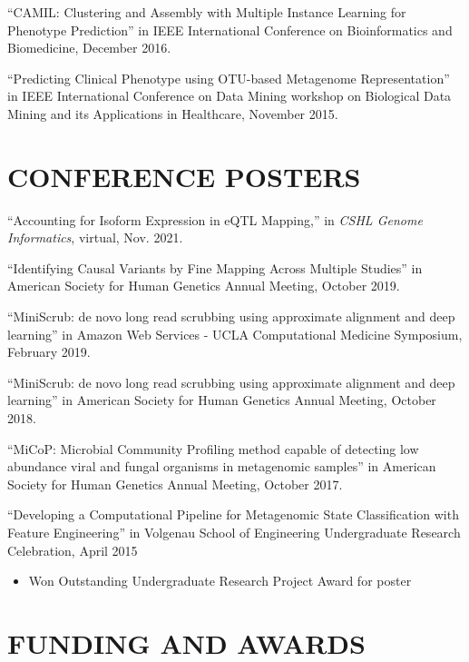 \documentclass[margin, 10pt]{res} %
\begin{document}
\begin{resume}
``CAMIL: Clustering and Assembly with Multiple Instance Learning for Phenotype Prediction'' in IEEE International Conference on Bioinformatics and Biomedicine, December 2016.

``Predicting Clinical Phenotype using OTU-based Metagenome Representation'' in IEEE International Conference on Data Mining workshop on Biological Data Mining and its Applications in Healthcare, November 2015.


\section{CONFERENCE POSTERS}

``Accounting for Isoform Expression in eQTL Mapping,'' in {\sl CSHL Genome Informatics}, virtual, Nov. 2021.

``Identifying Causal Variants by Fine Mapping Across Multiple Studies'' in American Society for Human Genetics Annual Meeting, October 2019. 

``MiniScrub: de novo long read scrubbing using approximate alignment and deep learning'' in Amazon Web Services - UCLA Computational Medicine Symposium, February 2019.

``MiniScrub: de novo long read scrubbing using approximate alignment and deep learning'' in American Society for Human Genetics Annual Meeting, October 2018.

``MiCoP: Microbial Community Profiling method capable of detecting low abundance viral and fungal organisms in metagenomic samples'' in American Society for Human Genetics Annual Meeting, October 2017.

``Developing a Computational Pipeline for Metagenomic State Classification with Feature Engineering'' in Volgenau School of Engineering Undergraduate Research Celebration, April 2015
\begin{itemize} \itemsep -2pt %
\item Won Outstanding Undergraduate Research Project Award for poster
\end{itemize}




\section{FUNDING AND AWARDS}


\end{resume}
\end{document}
